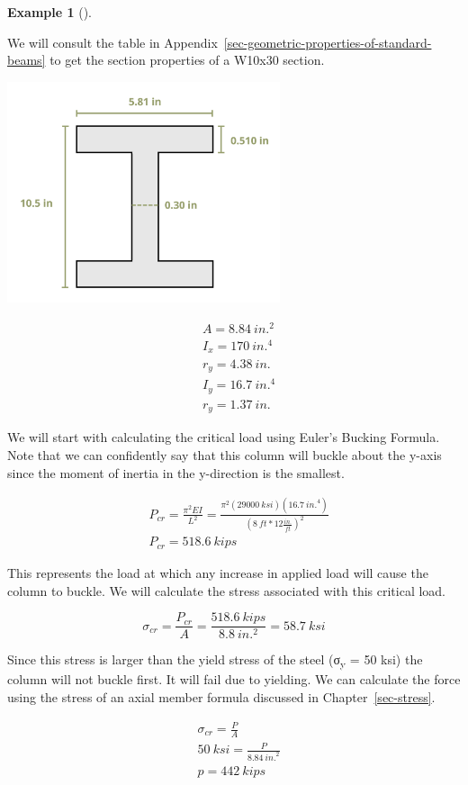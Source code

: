 \documentclass[
  letterpaper,
  DIV=11,
  numbers=noendperiod]{scrreprt}
\theoremstyle{definition}
\newtheorem{example}{Example}[chapter]
\theoremstyle{remark}
\begin{document}
\begin{tcolorbox}
\begin{example}[]
\begin{tcolorbox}
We will consult the table in
Appendix~\ref{sec-geometric-properties-of-standard-beams} to get the
section properties of a W10x30 section.

\begin{center}
\includegraphics[width=3.15625in,height=\textheight]{images/CH15s PNGs/example 15.1 part 2.png}
\end{center}

\[
\begin{aligned}
& A=8.84{~in.}^2 \\
& I_x=170{~in.}^4 \\
& r_y=4.38{~in.} \\
& I_y=16.7{~in.}^4 \\
& r_y=1.37{~in.}
\end{aligned}
\]

We will start with calculating the critical load using Euler's Bucking
Formula. Note that we can confidently say that this column will buckle
about the y-axis since the moment of inertia in the y-direction is the
smallest.

\[
\begin{aligned}
& P_{cr}=\frac{\pi^2 E I}{L^2}=\frac{\pi^2(29000{~ksi})(16.7{~in.}^4)}{\left(8{~ft}* 12\frac{in.}{ft}\right)^2} \\
& P_{cr}=518.6{~kips}
\end{aligned}
\]

This represents the load at which any increase in applied load will
cause the column to buckle. We will calculate the stress associated with
this critical load.

\[
\sigma_{c r}=\frac{P_{cr}}{A}=\frac{518.6{~kips}}{8.8{~in.^2}}=58.7{~ksi}
\]

Since this stress is larger than the yield stress of the steel
(σ\textsubscript{y} = 50 ksi) the column will not buckle first. It will
fail due to yielding. We can calculate the force using the stress of an
axial member formula discussed in Chapter~\ref{sec-stress}.

\[
\begin{aligned}
&\sigma_{cr} =\frac{P}{A} \\
& 50{~ksi} =\frac{P}{8.84{~in.}^2} \\
&p =442{~kips}
\end{aligned}
\]

\end{tcolorbox}

\end{example}

\end{tcolorbox}
\end{document}
